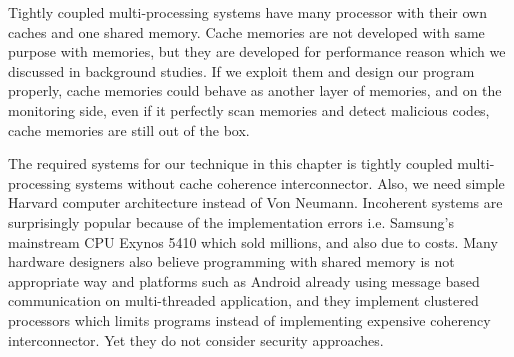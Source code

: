 Tightly coupled multi-processing systems have many processor with their own caches and one shared memory\cite{Jim2007}. Cache memories are not developed with same purpose with memories, but they are developed for performance reason which we discussed in background studies. If we exploit them and design our program properly, cache memories could behave as another layer of memories, and on the monitoring side, even if it perfectly scan memories and detect malicious codes, cache memories are still out of the box.

The required systems for our technique in this chapter is tightly coupled multi-processing systems without cache coherence interconnector. Also, we need simple Harvard computer architecture instead of Von Neumann. Incoherent systems are surprisingly popular because of the implementation errors i.e. Samsung's mainstream CPU Exynos 5410 which sold millions, and also due to costs. Many hardware designers also believe programming with shared memory is not appropriate way and platforms such as Android already using message based communication on multi-threaded application, and  they implement clustered processors which limits programs instead of implementing expensive coherency interconnector. Yet they do not consider security approaches.

	

